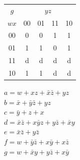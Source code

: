 \documentclass[10pt,a4paper]{scrartcl}
\begin{document}
\begin{tabular}{|c||c|c|c|c|}
  \hline
 $g$     & \multicolumn{4}{c|}{$yz$} \\
  $wx$   & 00                 & 01                 & 11                 & 10                 \\ \hline\hline
  00     &                 0  &                 0  & \cellcolor{gray}1  & \cellcolor{gray}1  \\ \hline
  01     & \cellcolor{gray}1  & \cellcolor{gray}1  &                 0  & \cellcolor{gray}1  \\ \hline
  11     & \cellcolor{gray}d  & \cellcolor{gray}d  & \cellcolor{gray}d  & \cellcolor{gray}d  \\ \hline
  10     & \cellcolor{gray}1  & \cellcolor{gray}1  & \cellcolor{gray}d  & \cellcolor{gray}d  \\ \hline
\end{tabular}

$a=w+xz+\bar x\bar z+yz$\\
$b=\bar x+\bar y\bar z+yz$\\
$c=\bar y+z+x$\\
$d=\bar x\bar z+x\bar yz+y\bar z+\bar xy$\\
$e=\bar x\bar z+y\bar z$\\
$f=w+\bar y\bar z+x\bar y+x\bar z$\\
$g=w+\bar xy+y\bar z+x\bar y$\\
\end{document}
